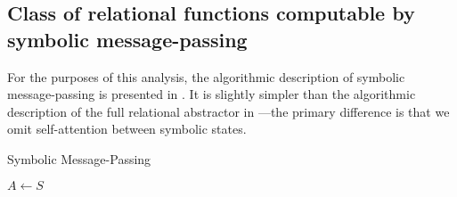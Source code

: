 \subsection{Class of relational functions computable by symbolic message-passing}
\label{ssec:function_class_symbolic_mp}
For the purposes of this analysis, the algorithmic description of symbolic message-passing is presented in . It is slightly simpler than the algorithmic description of the full relational  abstractor in ---the primary difference is that we omit self-attention between symbolic states.

\begin{algorithm}[ht!]
	\caption{Symbolic Message-Passing}\label{alg:symbolic_mp}

	\vspace{1em}

	$A \gets S$

\end{algorithm}



